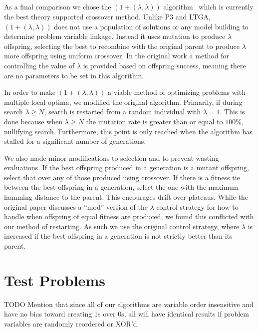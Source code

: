 \documentclass{sig-alternate}
\begin{document}
\subsection{}
As a final comparison we chose the $(1+(\lambda,\lambda))$ algorithm~\cite{doerr:2013:lambdalambda}
which is currently the best theory supported crossover method.  Unlike P3 and LTGA,
$(1+(\lambda,\lambda))$ does not use a population of solutions or any model building
to determine problem variable linkage.  Instead it uses mutation to produce $\lambda$
offspring, selecting the best to recombine with the original parent to produce $\lambda$
more offspring using uniform crossover.  In the original work a method for controlling
the value of $\lambda$ is provided based on offspring success, meaning there are no
parameters to be set in this algorithm.

In order to make $(1+(\lambda,\lambda))$ a viable method of optimizing problems
with multiple local optima, we modified the original algorithm.  Primarily, if
during search $\lambda \ge N$, search is restarted from a random individual with
$\lambda=1$.  This is done because when $\lambda \ge N$ the mutation rate is greater
than or equal to $100\%$, nullifying search.  Furthermore, this point is only reached
when the algorithm has stalled for a significant number of generations.

We also made minor modifications to selection and to prevent wasting evaluations.
If the best offspring produced in a generation is a mutant offspring, select that
over any of those produced using crossover.  If there is a fitness tie between the
best offspring in a generation, select the one with the maximum hamming distance
to the parent.  This encourages drift over plateaus.  While the original paper
discusses a ``mod'' version of the $\lambda$ control strategy for how to handle
when offspring of equal fitness are produced, we found this conflicted with our
method of restarting.  As such we use the original control strategy, where $\lambda$
is increased if the best offspring in a generation is not strictly better than its parent.

\section{Test Problems}
TODO Mention that since all of our algorithms are variable order insensitive
and have no bias toward creating 1s over 0s, all will have identical results if
problem variables are randomly reordered or XOR'd.
\end{document}
